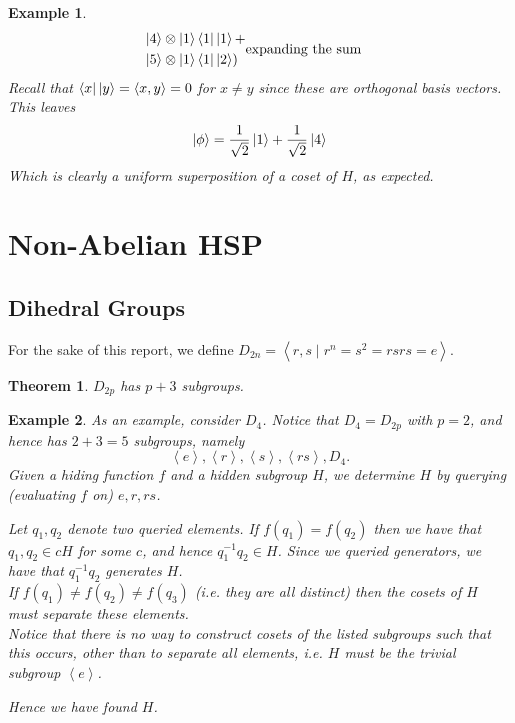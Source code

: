 \documentclass{article}
\renewcommand{\bra}{\Bra}
\renewcommand{\ket}{\Ket}
\theoremstyle{plain}
\newtheorem{theorem}{Theorem}
\theoremstyle{centered}
\newtheorem{example}{Example}
\renewcommand{\bra}{\Bra}
\renewcommand{\ket}{\Ket}
\newcommand{\inner}[2]{\left\langle #1, #2 \right\rangle}
\newcommand{\gen}[1]{\left\langle #1 \right\rangle}
\begin{document}
\begin{example}
\begin{align*}
\begin{aligned}
                    &\ket{4} \otimes \ket{1}\bra{1}\ket{1} + \\
                    &\ket{5} \otimes \ket{1}\bra{1}\ket{2}
                    )
                    \end{aligned} & \text{expanding the sum}
                \end{align*}
                Recall that $\bra{x}\ket{y} = \inner{x}{y} = 0$ for $x \neq y$ since these are orthogonal basis vectors. This leaves
                $$ \ket{\phi} = \frac{1}{\sqrt{2}} \ket{1} + \frac{1}{\sqrt{2}} \ket{4}$$
            Which is clearly a uniform superposition of a coset of $H$, as expected.
        \end{example}

\section{Non-Abelian HSP}\label{sec:non_abelian_HSP}
    \subsection{Dihedral Groups}\label{non_abelian_HSP:dihedral_group}

        For the sake of this report, we define $D_{2n} = \gen{r, s \mid r^n = s^2 = rsrs = e}$.
        \begin{theorem}
            $D_{2p}$ has $p + 3$ subgroups.
        \end{theorem}
        \begin{example}
            As an example, consider $D_4$.
            Notice that $D_4 = D_{2p}$ with $p = 2$, and hence has $2 + 3 = 5$ subgroups, namely
                $$\gen{e}, \gen{r}, \gen{s}, \gen{rs}, D_4.$$
            Given a hiding function $f$ and a hidden subgroup $H$, we determine $H$ by querying (evaluating $f$ on) $e, r, rs$.
            
            Let $q_1, q_2$ denote two queried elements.
            If $f(q_1) = f(q_2)$ then we have that $q_1, q_2 \in cH$ for some $c$, and hence $q_1^{-1} q_2 \in H$.
            Since we queried generators, we have that $q_1^{-1} q_2$ generates $H$.\\
            If $f(q_1) \neq f(q_2) \neq f(q_3)$ (i.e. they are all distinct) then the cosets of $H$ must separate these elements.\\
            Notice that there is no way to construct cosets of the listed subgroups such that this occurs, other than to separate all elements, i.e. $H$ must be the trivial subgroup $\gen{e}$.

            Hence we have found $H$.
        \end{example}
\end{document}
